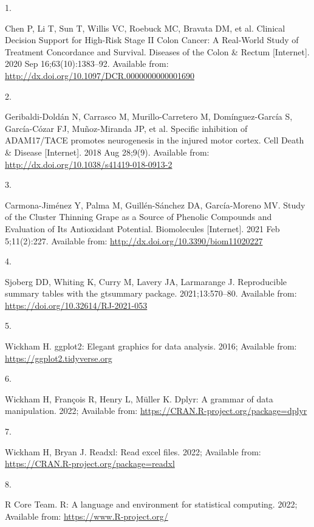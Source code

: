 \documentclass[
]{article}
\newlength{\cslhangindent}
\newlength{\csllabelwidth}
\newlength{\cslentryspacingunit} %
\newenvironment{CSLReferences}[2] %
 {%
  \setlength{\parindent}{0pt}
  \ifodd #1
  \let\oldpar\par
  \def\par{\hangindent=\cslhangindent\oldpar}
  \fi
  \setlength{\parskip}{#2\cslentryspacingunit}
 }%
 {}
\newcommand{\CSLLeftMargin}[1]{\parbox[t]{\csllabelwidth}{#1}}
\newcommand{\CSLRightInline}[1]{\parbox[t]{\linewidth - \csllabelwidth}{#1}\break}
\begin{document}
\hypertarget{refs}{}
\begin{CSLReferences}{0}{0}
\leavevmode{}%
\CSLLeftMargin{1. }%
\CSLRightInline{Chen P, Li T, Sun T, Willis VC, Roebuck MC, Bravata DM,
et al. Clinical Decision Support for High-Risk Stage II Colon Cancer: A
Real-World Study of Treatment Concordance and Survival. Diseases of the
Colon \& Rectum {[}Internet{]}. 2020 Sep 16;63(10):1383--92. Available
from: \url{http://dx.doi.org/10.1097/DCR.0000000000001690}}

\leavevmode{}%
\CSLLeftMargin{2. }%
\CSLRightInline{Geribaldi-Doldán N, Carrasco M, Murillo-Carretero M,
Domínguez-García S, García-Cózar FJ, Muñoz-Miranda JP, et al. Specific
inhibition of ADAM17/TACE promotes neurogenesis in the injured motor
cortex. Cell Death \& Disease {[}Internet{]}. 2018 Aug 28;9(9).
Available from: \url{http://dx.doi.org/10.1038/s41419-018-0913-2}}

\leavevmode{}%
\CSLLeftMargin{3. }%
\CSLRightInline{Carmona-Jiménez Y, Palma M, Guillén-Sánchez DA,
García-Moreno MV. Study of the Cluster Thinning Grape as a Source of
Phenolic Compounds and Evaluation of Its Antioxidant Potential.
Biomolecules {[}Internet{]}. 2021 Feb 5;11(2):227. Available from:
\url{http://dx.doi.org/10.3390/biom11020227}}

\leavevmode{}%
\CSLLeftMargin{4. }%
\CSLRightInline{Sjoberg DD, Whiting K, Curry M, Lavery JA, Larmarange J.
Reproducible summary tables with the gtsummary package. 2021;13:570--80.
Available from: \url{https://doi.org/10.32614/RJ-2021-053}}

\leavevmode{}%
\CSLLeftMargin{5. }%
\CSLRightInline{Wickham H. ggplot2: Elegant graphics for data analysis.
2016; Available from: \url{https://ggplot2.tidyverse.org}}

\leavevmode{}%
\CSLLeftMargin{6. }%
\CSLRightInline{Wickham H, François R, Henry L, Müller K. Dplyr: A
grammar of data manipulation. 2022; Available from:
\url{https://CRAN.R-project.org/package=dplyr}}

\leavevmode{}%
\CSLLeftMargin{7. }%
\CSLRightInline{Wickham H, Bryan J. Readxl: Read excel files. 2022;
Available from: \url{https://CRAN.R-project.org/package=readxl}}

\leavevmode{}%
\CSLLeftMargin{8. }%
\CSLRightInline{R Core Team. R: A language and environment for
statistical computing. 2022; Available from:
\url{https://www.R-project.org/}}


\end{CSLReferences}
\end{document}
